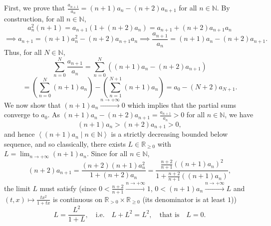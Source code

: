 \begin{solution}
    First, we prove that \( \frac{a_{n+1}}{a_n} = \left(n+1\right) a_n - \left(n+2\right) a_{n+1} \) for all \( n \in \mathbb{N} \). By construction, for all \( n \in \mathbb{N} \),
    \[
        a_n^2 \left(n+1\right) = a_{n+1} \left(1 + \left(n+2\right) a_n\right) = a_{n+1} + \left(n+2\right) a_{n+1} a_n
    \]
    \[
        \implies a_{n+1} = \left(n+1\right) a_n^2 - \left(n+2\right) a_{n+1} a_n \implies \frac{a_{n+1}}{a_n} = \left(n+1\right) a_n - \left(n+2\right) a_{n+1}.
    \]
    Thus, for all \( N \in \mathbb{N} \),
    \[
        \sum_{n=0}^{N} \frac{a_{n+1}}{a_n} = \sum_{n=0}^{N} \left(\left(n+1\right) a_n - \left(n+2\right) a_{n+1}\right)
    \]
    \[
        = \left(\sum_{n=0}^{N} \left(n+1\right) a_n\right) - \left(\sum_{n=1}^{N+1} \left(n+1\right) a_n\right) = a_0 - \left(N+2\right) a_{N+1}.
    \]
    We now show that \( \left(n+1\right) a_n \overset{n \to +\infty}{\longrightarrow} 0 \) which implies that the partial sums converge to \( a_0 \). As \( \left(n+1\right) a_n - \left(n+2\right) a_{n+1} = \frac{a_{n+1}}{a_n} > 0 \) for all \( n \in \mathbb{N} \), we have
    \[
        \left(n+1\right) a_n > \left(n+2\right) a_{n+1} > 0,
    \]
    and hence \( \left\langle\left(n+1\right) a_n \mid n \in \mathbb{N}\right\rangle \) is a strictly decreasing bounded below sequence, and so classically, there exists \( L \in \mathbb{R}_{\geq 0} \) with \( L = \lim_{n \to +\infty} \left(n+1\right) a_n \). Since for all \( n \in \mathbb{N} \),
    \[
        \left(n+2\right) a_{n+1} = \frac{\left(n+2\right) \left(n+1\right) a_n^2}{1 + \left(n+2\right) a_n} = \frac{\frac{n+2}{n+1} \left(\left(n+1\right) a_n\right)^2}{1 + \frac{n+2}{n+1} \left(\left(n+1\right) a_n\right)},
    \]
    the limit \( L \) must satisfy (since \( 0<\frac{n+2}{n+1} \overset{n \to +\infty}{\longrightarrow} 1 \), \( 0<\left(n+1\right) a_n \overset{n \to +\infty}{\longrightarrow} L \) and \( \left(t, x\right) \mapsto \frac{t x^2}{1 + t x} \) is continuous on \( \mathbb{R}_{>0} \times \mathbb{R}_{\geq 0} \) (its denominator is at least \( 1 \)))
    \[
        L = \frac{L^2}{1+L}, \quad \text{i.e.} \quad L + L^2 = L^2, \quad \text{that is} \quad L = 0.
    \]
\end{solution}
